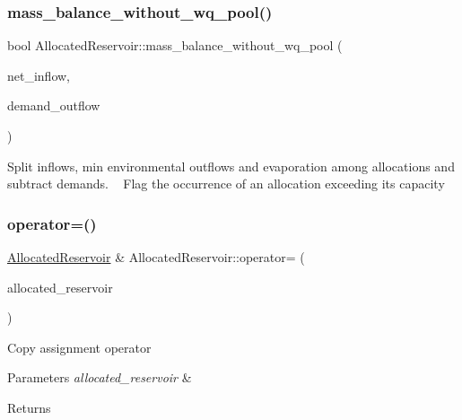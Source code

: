 \subsubsection{\texorpdfstring{mass\+\_\+balance\+\_\+without\+\_\+wq\+\_\+pool()}{mass\_balance\_without\_wq\_pool()}}
{\footnotesize\ttfamily bool Allocated\+Reservoir\+::mass\+\_\+balance\+\_\+without\+\_\+wq\+\_\+pool (\begin{DoxyParamCaption}\item[{double}]{net\+\_\+inflow,  }\item[{vector$<$ double $>$ \&}]{demand\+\_\+outflow }\end{DoxyParamCaption})}

Split inflows, min environmental outflows and evaporation among allocations and subtract demands. ~\newline
 Flag the occurrence of an allocation exceeding its capacity \mbox{\label{classAllocatedReservoir_a83551e53169014906ce7380005efb4f8}} 
\subsubsection{\texorpdfstring{operator=()}{operator=()}}
{\footnotesize\ttfamily \mbox{\hyperlink{classAllocatedReservoir}{Allocated\+Reservoir}} \& Allocated\+Reservoir\+::operator= (\begin{DoxyParamCaption}\item[{const \mbox{\hyperlink{classAllocatedReservoir}{Allocated\+Reservoir}} \&}]{allocated\+\_\+reservoir }\end{DoxyParamCaption})}

Copy assignment operator 
\begin{DoxyParams}{Parameters}
{\em allocated\+\_\+reservoir} & \\
\hline
\end{DoxyParams}
\begin{DoxyReturn}{Returns}

\end{DoxyReturn}
\mbox{\label{classAllocatedReservoir_a3a9b7ce2e1d42cc373095cfd40ef2ae2}} 
